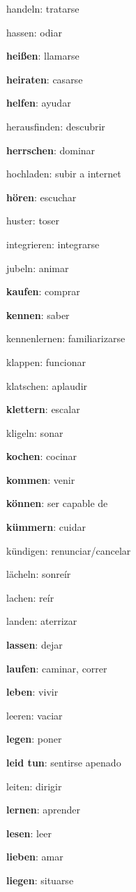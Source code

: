 \begin{multicols}{2}
\begin{myitemize}
\item handeln: tratarse
\item hassen: odiar
\item \textbf{heißen}: llamarse
\item \textbf{heiraten}: casarse
\item \textbf{helfen}: ayudar
\item herausfinden: descubrir
\item \textbf{herrschen}: dominar
\item hochladen: subir a internet
\item \textbf{hören}: escuchar
\item huster: toser
\item integrieren: integrarse
\item jubeln: animar
\item \textbf{kaufen}: comprar
\item \textbf{kennen}: saber
\item kennenlernen: familiarizarse
\item klappen: funcionar
\item klatschen: aplaudir
\item \textbf{klettern}: escalar
\item kligeln: sonar
\item \textbf{kochen}: cocinar
\item \textbf{kommen}: venir
\item \textbf{können}: ser capable de
\item \textbf{kümmern}: cuidar
\item kündigen: renunciar/cancelar
\item lächeln: sonreír
\item lachen: reír
\item landen: aterrizar
\item \textbf{lassen}: dejar
\item \textbf{laufen}: caminar, correr
\item \textbf{leben}: vivir
\item leeren: vaciar
\item \textbf{legen}: poner
\item \textbf{leid tun}: sentirse apenado
\item leiten: dirigir
\item \textbf{lernen}: aprender
\item \textbf{lesen}: leer
\item \textbf{lieben}: amar
\item \textbf{liegen}: situarse

\end{myitemize}
\end{multicols}
